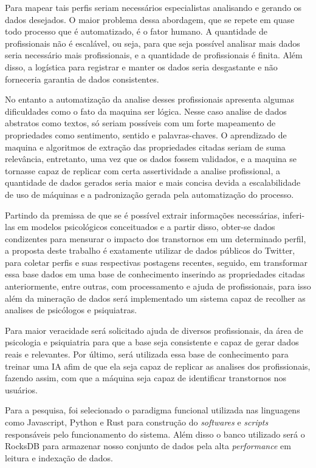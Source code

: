 Para mapear tais perfis seriam necessários especialistas analisando e gerando os dados desejados. O maior problema dessa abordagem, que se repete em quase todo processo que é automatizado, é o fator humano. A quantidade de profissionais não é escalável, ou seja, para que seja possível analisar mais dados seria necessário mais profissionais, e a quantidade de profissionais é finita. Além disso, a logística para registrar e manter os dados seria desgastante e não forneceria garantia de dados consistentes.

No entanto a automatização da analise desses profissionais apresenta algumas dificuldades como o fato da maquina ser lógica. Nesse caso analise de dados abstratos como textos, só seriam possíveis com um forte mapeamento de propriedades como sentimento, sentido e palavras-chaves. O aprendizado de maquina e algoritmos de extração das propriedades citadas seriam de suma relevância, entretanto, uma vez que os dados fossem validados, e a maquina se tornasse capaz de replicar com certa assertividade a analise profissional, a quantidade de dados gerados seria maior e mais concisa devida a escalabilidade de uso de máquinas e a padronização gerada pela automatização do processo.

Partindo da premissa de que se é possível extrair informações necessárias, inferi-las em modelos psicológicos conceituados e a partir disso, obter-se dados condizentes para mensurar o impacto dos transtornos em um determinado perfil, a proposta deste trabalho é exatamente utilizar de dados públicos do Twitter, para coletar perfis e suas respectivas postagens recentes, seguido, em transformar essa base dados em uma base de conhecimento inserindo as propriedades citadas anteriormente, entre outras, com processamento e ajuda de profissionais, para isso além da mineração de dados será implementado um sistema capaz de recolher as analises de psicólogos e psiquiatras.

Para maior veracidade será solicitado ajuda de diversos profissionais, da área de psicologia e psiquiatria para que a base seja consistente e capaz de gerar dados reais e relevantes. Por último, será utilizada essa base de conhecimento para treinar uma IA afim de que ela seja capaz de replicar as analises dos profissionais, fazendo assim, com que a máquina seja capaz de identificar transtornos nos usuários.

Para a pesquisa, foi selecionado o paradigma funcional utilizada nas linguagens como Javascript, Python e Rust para construção do \textit{softwares} e \textit{scripts} responsáveis pelo funcionamento do sistema. Além disso o banco utilizado será o RocksDB para armazenar nosso conjunto de dados pela alta \textit{performance} em leitura e indexação de dados.


